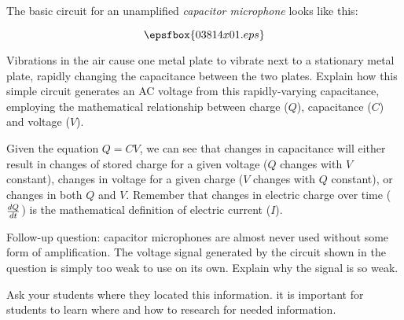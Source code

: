

The basic circuit for an unamplified {\it capacitor microphone} looks like this:

$$\epsfbox{03814x01.eps}$$

Vibrations in the air cause one metal plate to vibrate next to a stationary metal plate, rapidly changing the capacitance between the two plates.  Explain how this simple circuit generates an AC voltage from this rapidly-varying capacitance, employing the mathematical relationship between charge ($Q$), capacitance ($C$) and voltage ($V$).







Given the equation $Q = CV$, we can see that changes in capacitance will either result in changes of stored charge for a given voltage ($Q$ changes with $V$ constant), changes in voltage for a given charge ($V$ changes with $Q$ constant), or changes in both $Q$ and $V$.  Remember that changes in electric charge over time ($dQ \over dt$) is the mathematical definition of electric current ($I$).

\vskip 10pt

Follow-up question: capacitor microphones are almost never used without some form of amplification.  The voltage signal generated by the circuit shown in the question is simply too weak to use on its own.  Explain why the signal is so weak.







Ask your students where they located this information.  it is important for students to learn where and how to research for needed information.




